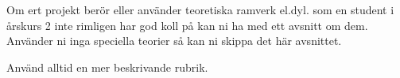 Om ert projekt berör eller använder teoretiska ramverk el.dyl. som en student i årskurs 2 inte rimligen har god koll på kan ni ha med ett avsnitt om dem.
Använder ni inga speciella teorier så kan ni skippa det här avsnittet.

Använd alltid en mer beskrivande rubrik.
